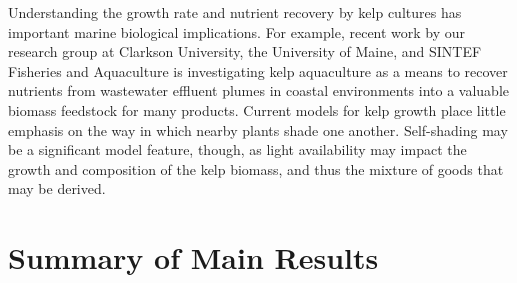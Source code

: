 Understanding the growth rate and nutrient recovery by
kelp cultures has important marine biological implications. For example, recent
work by our research group at Clarkson University, the University of Maine, and
SINTEF Fisheries and Aquaculture is investigating kelp aquaculture as a means to
recover nutrients from wastewater effluent plumes in coastal environments into a
valuable biomass feedstock for many products. Current models for kelp growth
place little emphasis on the way in which nearby plants shade one another.
Self-shading may be a significant model feature, though, as light availability
may impact the growth and composition of the kelp biomass, and thus the mixture
of goods that may be derived.

\section{Summary of Main Results}